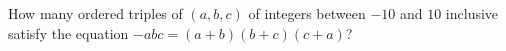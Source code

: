 How many ordered triples of $(a, b, c)$ of integers between $-10$ and $10$ inclusive satisfy the equation $-abc = (a + b)(b + c)(c + a)$?
